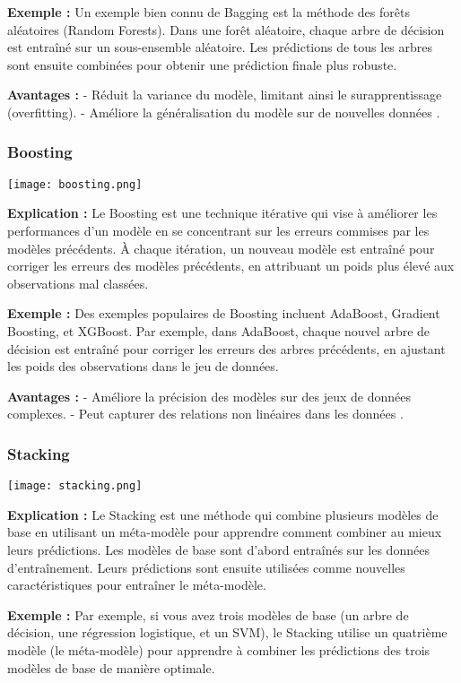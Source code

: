 \documentclass[10pt,a4paper]{article}
\begin{document}
\textbf{Exemple :}
Un exemple bien connu de Bagging est la méthode des forêts aléatoires (Random Forests). Dans une forêt aléatoire, chaque arbre de décision est entraîné sur un sous-ensemble aléatoire. Les prédictions de tous les arbres sont ensuite combinées pour obtenir une prédiction finale plus robuste.

\textbf{Avantages :}
- Réduit la variance du modèle, limitant ainsi le surapprentissage (overfitting).
- Améliore la généralisation du modèle sur de nouvelles données \cite{ibm_ensemble}.

\subsubsection*{Boosting}

\texttt{[image: boosting.png]}

\textbf{Explication :}
Le Boosting est une technique itérative qui vise à améliorer les performances d'un modèle en se concentrant sur les erreurs commises par les modèles précédents. À chaque itération, un nouveau modèle est entraîné pour corriger les erreurs des modèles précédents, en attribuant un poids plus élevé aux observations mal classées.

\textbf{Exemple :}
Des exemples populaires de Boosting incluent AdaBoost, Gradient Boosting, et XGBoost. Par exemple, dans AdaBoost, chaque nouvel arbre de décision est entraîné pour corriger les erreurs des arbres précédents, en ajustant les poids des observations dans le jeu de données.

\textbf{Avantages :}
- Améliore la précision des modèles sur des jeux de données complexes.
- Peut capturer des relations non linéaires dans les données \cite{ieee_ensemble}.

\subsubsection*{Stacking}

\texttt{[image: stacking.png]}

\textbf{Explication :}
Le Stacking est une méthode qui combine plusieurs modèles de base en utilisant un méta-modèle pour apprendre comment combiner au mieux leurs prédictions. Les modèles de base sont d'abord entraînés sur les données d'entraînement. Leurs prédictions sont ensuite utilisées comme nouvelles caractéristiques pour entraîner le méta-modèle.

\textbf{Exemple :}
Par exemple, si vous avez trois modèles de base (un arbre de décision, une régression logistique, et un SVM), le Stacking utilise un quatrième modèle (le méta-modèle) pour apprendre à combiner les prédictions des trois modèles de base de manière optimale.
\end{document}
